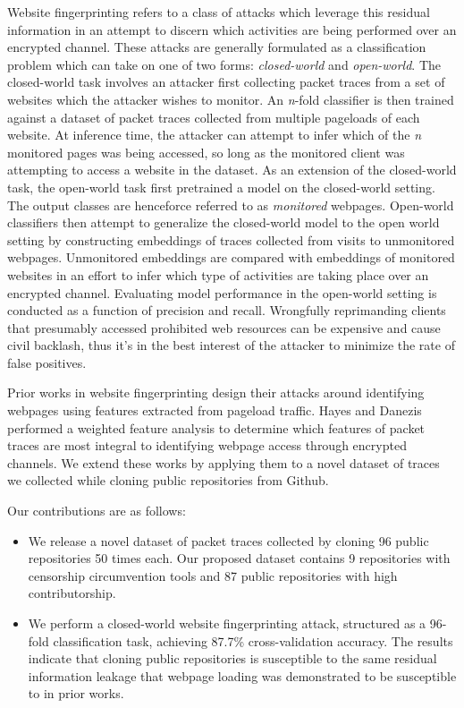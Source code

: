 \documentclass[sigconf,authorversion,nonacm]{acmart}
\begin{document}
Website fingerprinting refers to a class of attacks which leverage this residual information in an attempt to discern which activities are being performed over an encrypted channel. These attacks are generally formulated as a classification problem which can take on one of two forms: \textit{closed-world} and \textit{open-world}. The closed-world task involves an attacker first collecting packet traces from a set of  websites which the attacker wishes to monitor. An \textit{n}-fold classifier is then trained against a dataset of packet traces collected from multiple pageloads of each website. At inference time, the attacker can attempt to infer which of the \textit{n} monitored pages was being accessed, so long as the monitored client was attempting to access a website in the dataset. As an extension of the closed-world task, the open-world task first pretrained a model on the closed-world setting. The output classes are henceforce referred to as \textit{monitored} webpages. Open-world classifiers then attempt to generalize the closed-world model to the open world setting by constructing embeddings of traces collected from visits to unmonitored webpages. Unmonitored embeddings are compared with embeddings of monitored websites in an effort to infer which type of activities are taking place over an encrypted channel. Evaluating model performance in the open-world setting is conducted as a function of precision and recall. Wrongfully reprimanding clients that presumably accessed prohibited web resources can be expensive and cause civil backlash, thus it's in the best interest of the attacker to minimize the rate of false positives.

Prior works in website fingerprinting design their attacks around identifying webpages using features extracted from pageload traffic. Hayes and Danezis\citep{hayes2016k} performed a weighted feature analysis to determine which features of packet traces are most integral to identifying webpage access through encrypted channels. We extend these works by applying them to a novel dataset of traces we collected while cloning public repositories from Github.

Our contributions are as follows:
\begin{itemize}
  \item We release a novel dataset of packet traces collected by cloning 96 public repositories 50 times each. Our proposed dataset contains 9 repositories with censorship circumvention tools and 87 public repositories with high contributorship.
  \item We perform a closed-world website fingerprinting attack, structured as a 96-fold classification task, achieving 87.7\% cross-validation accuracy. The results indicate that cloning public repositories is susceptible to the same residual information leakage that webpage loading was demonstrated to be susceptible to in prior works.
\end{itemize}
\end{document}
